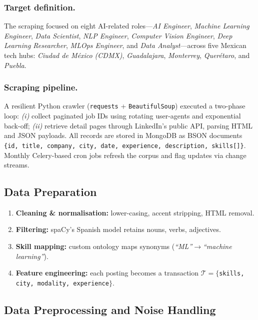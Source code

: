 \documentclass{svproc} %
\begin{document}
	\subsubsection{Target definition.}
	The scraping focused on eight AI-related roles—\emph{AI Engineer}, \emph{Machine Learning Engineer}, \emph{Data Scientist}, \emph{NLP Engineer}, \emph{Computer Vision Engineer}, \emph{Deep Learning Researcher}, \emph{MLOps Engineer}, and \emph{Data Analyst}—across five Mexican tech hubs: \emph{Ciudad de México (CDMX)}, \emph{Guadalajara}, \emph{Monterrey}, \emph{Querétaro}, and \emph{Puebla}.
	
	
	\subsubsection{Scraping pipeline.}
	A resilient Python crawler (\texttt{requests} + \texttt{BeautifulSoup}) executed a two-phase loop:  
	\emph{(i)} collect paginated job IDs using rotating user-agents and exponential back-off;  
	\emph{(ii)} retrieve detail pages through LinkedIn’s public API, parsing HTML and JSON payloads.  
	All records are stored in MongoDB as BSON documents\\
	\verb|{id, title, company, city, date, experience, description, skills[]}|.  
	Monthly Celery-based cron jobs refresh the corpus and flag updates via change streams.
	
	\subsection{Data Preparation}
	\label{ssec:data_prep}
	
	\begin{enumerate}
		\item \textbf{Cleaning \& normalisation:} lower-casing, accent stripping, HTML removal.
		\item \textbf{Filtering:} spaCy’s Spanish model retains nouns, verbs, adjectives.
		\item \textbf{Skill mapping:} custom ontology maps synonyms (\textit{“ML”}$\rightarrow$\textit{“machine learning”}).
		\item \textbf{Feature engineering:} each posting becomes a transaction
		$\mathcal{T}=\{$\texttt{skills, city, modality, experience}$\}$.
	\end{enumerate}
	
	\subsection{Data Preprocessing and Noise Handling}
	
\end{document}
